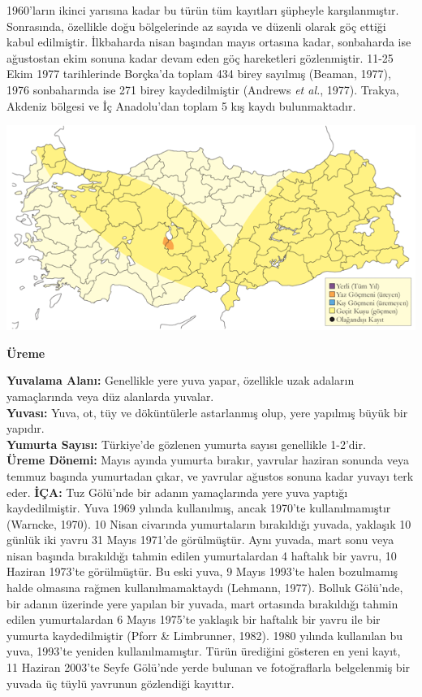 \documentclass[
  a4paper,
  DIV=11,
  numbers=noendperiod]{scrreprt}
\begin{document}
1960'ların ikinci yarısına kadar bu türün tüm kayıtları şüpheyle
karşılanmıştır. Sonrasında, özellikle doğu bölgelerinde az sayıda ve
düzenli olarak göç ettiği kabul edilmiştir. İlkbaharda nisan başından
mayıs ortasına kadar, sonbaharda ise ağustostan ekim sonuna kadar devam
eden göç hareketleri gözlenmiştir. 11-25 Ekim 1977 tarihlerinde
Borçka'da toplam 434 birey sayılmış (Beaman, 1977), 1976 sonbaharında
ise 271 birey kaydedilmiştir (Andrews \emph{et al.}, 1977). Trakya,
Akdeniz bölgesi ve İç Anadolu'dan toplam 5 kış kaydı bulunmaktadır.

\includegraphics{images/harita_Page_094.png}

\textbf{Üreme}

\textbf{Yuvalama Alanı:} Genellikle yere yuva yapar, özellikle uzak
adaların yamaçlarında veya düz alanlarda yuvalar.\\
\textbf{Yuvası:} Yuva, ot, tüy ve döküntülerle astarlanmış olup, yere
yapılmış büyük bir yapıdır.\\
\textbf{Yumurta Sayısı:} Türkiye'de gözlenen yumurta sayısı genellikle
1-2'dir.\\
\textbf{Üreme Dönemi:} Mayıs ayında yumurta bırakır, yavrular haziran
sonunda veya temmuz başında yumurtadan çıkar, ve yavrular ağustos sonuna
kadar yuvayı terk eder. \textbf{İÇA:} Tuz Gölü'nde bir adanın
yamaçlarında yere yuva yaptığı kaydedilmiştir. Yuva 1969 yılında
kullanılmış, ancak 1970'te kullanılmamıştır (Warncke, 1970). 10 Nisan
civarında yumurtaların bırakıldığı yuvada, yaklaşık 10 günlük iki yavru
31 Mayıs 1971'de görülmüştür. Aynı yuvada, mart sonu veya nisan başında
bırakıldığı tahmin edilen yumurtalardan 4 haftalık bir yavru, 10 Haziran
1973'te görülmüştür. Bu eski yuva, 9 Mayıs 1993'te halen bozulmamış
halde olmasına rağmen kullanılmamaktaydı (Lehmann, 1977). Bolluk
Gölü'nde, bir adanın üzerinde yere yapılan bir yuvada, mart ortasında
bırakıldığı tahmin edilen yumurtalardan 6 Mayıs 1975'te yaklaşık bir
haftalık bir yavru ile bir yumurta kaydedilmiştir (Pforr \& Limbrunner,
1982). 1980 yılında kullanılan bu yuva, 1993'te yeniden
kullanılmamıştır. Türün ürediğini gösteren en yeni kayıt, 11 Haziran
2003'te Seyfe Gölü'nde yerde bulunan ve fotoğraflarla belgelenmiş bir
yuvada üç tüylü yavrunun gözlendiği kayıttır.
\end{document}
